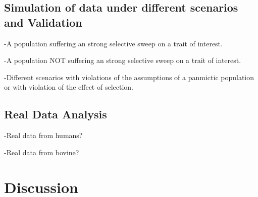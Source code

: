 \documentclass[a4paper,11pt]{article}
\begin{document}
\subsection{Simulation of data under different scenarios and Validation}
\noindent -A  population suffering an strong selective sweep on a trait of interest.\par
\noindent -A  population NOT suffering an strong selective sweep on a trait of interest.\par
\noindent -Different scenarios with violations of the assumptions of a panmictic population or with violation of the effect of selection. %

\subsection{Real Data Analysis}
\noindent -Real data from humans?\par
\noindent -Real data from bovine?\par

\section{Discussion}


\newpage


\end{document}
